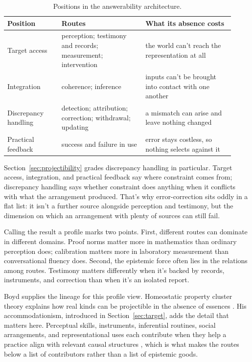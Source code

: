\documentclass[12pt]{article}
\begin{document}
\begin{table}[H]
\centering\small
\caption{Positions in the answerability architecture.}\label{tab:layers}
\begin{tabular}{@{}>{\raggedright\arraybackslash}p{0.22\linewidth}
 >{\raggedright\arraybackslash}p{0.34\linewidth}
 >{\raggedright\arraybackslash}p{0.36\linewidth}@{}}
\toprule
Position & Routes & What its absence costs \\
\midrule
Target access & perception; testimony and records; measurement; intervention &
the world can't reach the representation at all \\
Integration & coherence; inference &
inputs can't be brought into contact with one another \\
Discrepancy handling & detection; attribution; correction; withdrawal; updating &
a mismatch can arise and leave nothing changed \\
Practical feedback & success and failure in use &
error stays costless, so nothing selects against it \\
\bottomrule
\end{tabular}
\end{table}

Section~\ref{sec:projectibility} grades discrepancy handling in particular. Target access,
integration, and practical feedback say where constraint comes from; discrepancy handling
says whether constraint does anything when it conflicts with what the arrangement
produced. That's why error-correction sits oddly in a flat list: it isn't a further source
alongside perception and testimony, but the dimension on which an arrangement with
plenty of sources can still fail.

Calling the result a profile marks two points. First, different routes can dominate in
different domains. Proof norms matter more in mathematics than ordinary perception does;
calibration matters more in laboratory measurement than conversational fluency does.
Second, the epistemic force often lies in the relations among routes. Testimony matters
differently when it's backed by records, instruments, and correction than when it's an
isolated report.

Boyd supplies the lineage for this profile view. Homeostatic property cluster theory
explains how real kinds can be projectible in the absence of essences
\citep{boyd1991,boyd1999}.
His accommodationism, introduced in Section~\ref{sec:target}, adds the detail that matters
here. Perceptual skills, instruments, inferential routines, social arrangements, and
representational uses each contribute when they help a practice align with relevant causal
structures \citep{boyd_2019_rethinking_natural_kinds_reference_truth}, which is what makes
the routes below a list of contributors rather than a list of epistemic goods.
\end{document}
